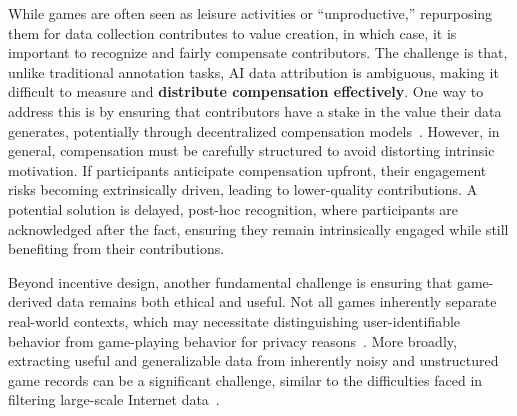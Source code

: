 While games are often seen as leisure activities or ``unproductive,'' repurposing them for data collection contributes to value creation, in which case, it is important to recognize and fairly compensate contributors. The challenge is that, unlike traditional annotation tasks, AI data attribution is ambiguous, making it difficult to measure and \textbf{distribute compensation effectively}. One way to address this is by ensuring that contributors have a stake in the value their data generates, potentially through decentralized compensation models~\cite{loyalAI}. However, in general, compensation must be carefully structured to avoid distorting intrinsic motivation. If participants anticipate compensation upfront, their engagement risks becoming extrinsically driven, leading to lower-quality contributions. A potential solution is delayed, post-hoc recognition, where participants are acknowledged after the fact, ensuring they remain intrinsically engaged while still benefiting from their contributions.

Beyond incentive design, another fundamental challenge is ensuring that game-derived data remains both ethical and useful. Not all games inherently separate real-world contexts, which may necessitate distinguishing user-identifiable behavior from game-playing behavior for privacy reasons~\cite{nair2022exploring}. More broadly, extracting useful and generalizable data from inherently noisy and unstructured game records can be a significant challenge, similar to the difficulties faced in filtering large-scale Internet data~\cite{fang2023data}.